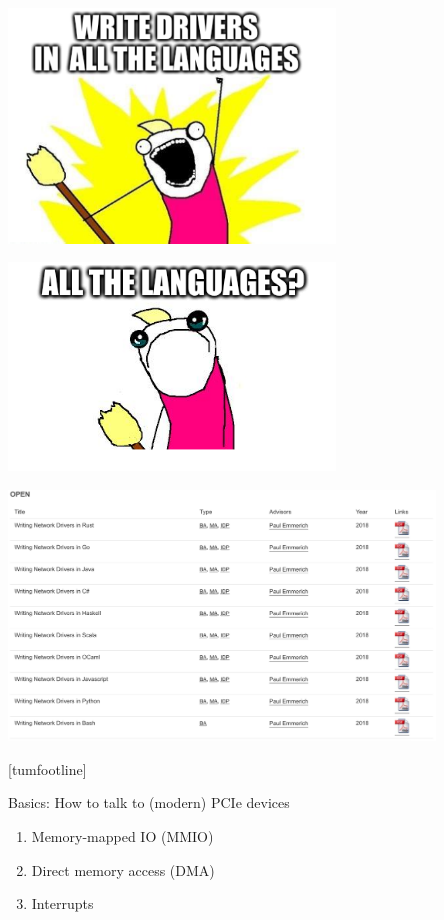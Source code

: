 \documentclass[NET,english,aspectratio=169,notitleframe,draft]{tumbeamer}
\begin{document}
\begin{frame}{}
\centering\includegraphics[width=0.65\textwidth]{pics/allthe1}
\end{frame}

\begin{frame}{}
\centering\includegraphics[width=0.65\textwidth]{pics/allthe2}
\end{frame}

\begin{frame}{}
\centering\includegraphics[width=0.85\textwidth]{pics/theses}
\end{frame}
[tumfootline]


\begin{frame}{Basics: How to talk to (modern) PCIe devices}
\begin{enumerate}
\item Memory-mapped IO (MMIO)
\item Direct memory access (DMA)
\item Interrupts
\end{enumerate}
\end{frame}
\end{document}
